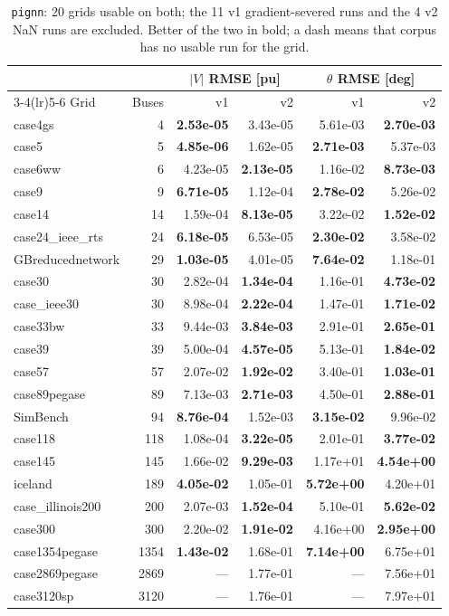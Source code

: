 \documentclass[10pt]{article}
\begin{document}
\begin{table}[H]
\centering\small
\begin{tabular}{lr rr rr}
\toprule
 & & \multicolumn{2}{c}{$|V|$ RMSE [pu]} & \multicolumn{2}{c}{$\theta$ RMSE [deg]} \\
\cmidrule(lr){3-4}\cmidrule(lr){5-6}
Grid & Buses & v1 & v2 & v1 & v2 \\
\midrule
case4gs & 4 & \textbf{2.53e-05} & 3.43e-05 & 5.61e-03 & \textbf{2.70e-03} \\
case5 & 5 & \textbf{4.85e-06} & 1.62e-05 & \textbf{2.71e-03} & 5.37e-03 \\
case6ww & 6 & 4.23e-05 & \textbf{2.13e-05} & 1.16e-02 & \textbf{8.73e-03} \\
case9 & 9 & \textbf{6.71e-05} & 1.12e-04 & \textbf{2.78e-02} & 5.26e-02 \\
case14 & 14 & 1.59e-04 & \textbf{8.13e-05} & 3.22e-02 & \textbf{1.52e-02} \\
case24\_ieee\_rts & 24 & \textbf{6.18e-05} & 6.53e-05 & \textbf{2.30e-02} & 3.58e-02 \\
GBreducednetwork & 29 & \textbf{1.03e-05} & 4.01e-05 & \textbf{7.64e-02} & 1.18e-01 \\
case30 & 30 & 2.82e-04 & \textbf{1.34e-04} & 1.16e-01 & \textbf{4.73e-02} \\
case\_ieee30 & 30 & 8.98e-04 & \textbf{2.22e-04} & 1.47e-01 & \textbf{1.71e-02} \\
case33bw & 33 & 9.44e-03 & \textbf{3.84e-03} & 2.91e-01 & \textbf{2.65e-01} \\
case39 & 39 & 5.00e-04 & \textbf{4.57e-05} & 5.13e-01 & \textbf{1.84e-02} \\
case57 & 57 & 2.07e-02 & \textbf{1.92e-02} & 3.40e-01 & \textbf{1.03e-01} \\
case89pegase & 89 & 7.13e-03 & \textbf{2.71e-03} & 4.50e-01 & \textbf{2.88e-01} \\
SimBench & 94 & \textbf{8.76e-04} & 1.52e-03 & \textbf{3.15e-02} & 9.96e-02 \\
case118 & 118 & 1.08e-04 & \textbf{3.22e-05} & 2.01e-01 & \textbf{3.77e-02} \\
case145 & 145 & 1.66e-02 & \textbf{9.29e-03} & 1.17e+01 & \textbf{4.54e+00} \\
iceland & 189 & \textbf{4.05e-02} & 1.05e-01 & \textbf{5.72e+00} & 4.20e+01 \\
case\_illinois200 & 200 & 2.07e-03 & \textbf{1.52e-04} & 5.10e-01 & \textbf{5.62e-02} \\
case300 & 300 & 2.20e-02 & \textbf{1.91e-02} & 4.16e+00 & \textbf{2.95e+00} \\
case1354pegase & 1354 & \textbf{1.43e-02} & 1.68e-01 & \textbf{7.14e+00} & 6.75e+01 \\
case2869pegase & 2869 & --- & 1.77e-01 & --- & 7.56e+01 \\
case3120sp & 3120 & --- & 1.76e-01 & --- & 7.97e+01 \\
\bottomrule
\end{tabular}
\caption{\texttt{pignn}: 20 grids usable on both; the 11 v1 gradient-severed runs and the 4 v2 NaN runs are excluded. Better of the two in bold; a dash means that corpus
has no usable run for the grid.}
\end{table}
\end{document}
